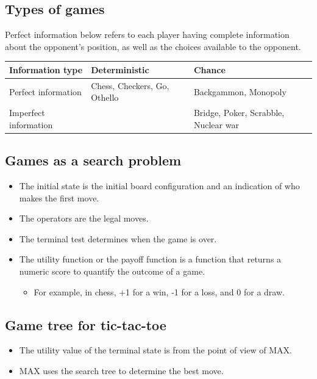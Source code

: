 \documentclass[11pt]{article}
\begin{document}
 \newpage
\subsection{Types of games}
\label{sec:orgf0bba3e}
Perfect information below refers to each player having complete information about the opponent's position, as well as the choices available to the opponent.

\begin{center}
\begin{tabular}{l|l|l}
Information type & Deterministic & Chance\\
\hline
Perfect information & Chess, Checkers, Go, Othello & Backgammon, Monopoly\\
Imperfect information &  & Bridge, Poker, Scrabble, Nuclear war\\
\end{tabular}
\end{center}
\subsection{Games as a search problem}
\label{sec:orgbed08ea}
\begin{itemize}
\item The initial state is the initial board configuration and an indication of who makes the first move.
\item The operators are the legal moves.
\item The terminal test determines when the game is over.
\item The utility function or the payoff function is a function that returns a numeric score to quantify the outcome of a game.
\begin{itemize}
\item For example, in chess, +1 for a win, -1 for a loss, and 0 for a draw.
\end{itemize}
\end{itemize}

 \newpage
\subsection{Game tree for tic-tac-toe}
\label{sec:orged82a6f}
\begin{itemize}
\item The utility value of the terminal state is from the point of view of MAX.
\item MAX uses the search tree to determine the best move.
\end{itemize}
\end{document}
